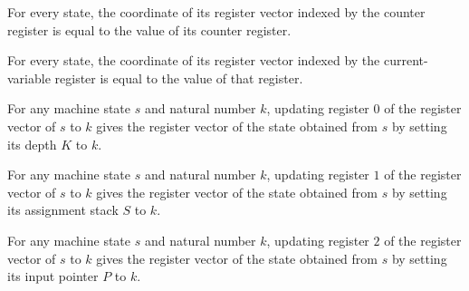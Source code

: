 \begin{lemma}
\label{Complexity.LogProg.TQBFARM.St.toV_C}
\leanok
{}
For every state, the coordinate of its register vector indexed by the counter register
is equal to the value of its counter register.
\end{lemma}

\begin{lemma}
\label{Complexity.LogProg.TQBFARM.St.toV_V}
\leanok
{}
For every state, the coordinate of its register vector indexed by the current-variable
register is equal to the value of that register.
\end{lemma}

\begin{lemma}
\label{Complexity.LogProg.TQBFARM.St.upd_K}
\leanok
{}
For any machine state $s$ and natural number $k$, updating register $0$ of the register
vector of $s$ to $k$ gives the register vector of the state obtained from $s$ by setting
its depth $K$ to $k$.
\end{lemma}

\begin{lemma}
\label{Complexity.LogProg.TQBFARM.St.upd_S}
\leanok
{}
For any machine state $s$ and natural number $k$, updating register $1$ of the register
vector of $s$ to $k$ gives the register vector of the state obtained from $s$ by setting
its assignment stack $S$ to $k$.
\end{lemma}

\begin{lemma}
\label{Complexity.LogProg.TQBFARM.St.upd_P}
\leanok
{}
For any machine state $s$ and natural number $k$, updating register $2$ of the register
vector of $s$ to $k$ gives the register vector of the state obtained from $s$ by setting
its input pointer $P$ to $k$.
\end{lemma}

